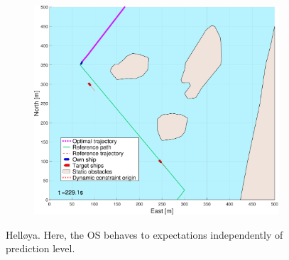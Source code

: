 \begin{figure}[!ht]
\begin{subfigure}[b]{0.494\textwidth}
        \subcaption{}
    \end{subfigure}
    \hfill
    \begin{subfigure}[b]{0.494\textwidth}
        \centering
        \includegraphics[width=\textwidth]{Images/NewFigures/Helloya/_Simple_0fig999_time=230}
        \subcaption{}
    \end{subfigure}
    \hfill
    \caption{Helløya. Here, the \gls{OS} behaves to expectations independently of prediction level.}
    \label{FIG: Helloya normal}
\end{figure}%
